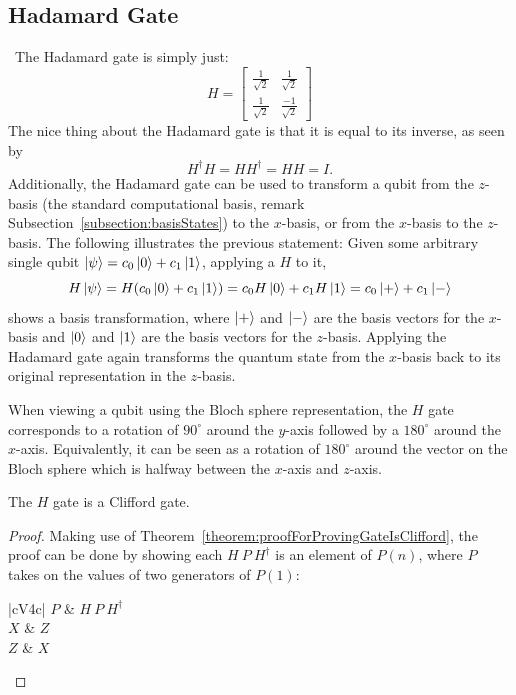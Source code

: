 \subsection{Hadamard Gate}\
The Hadamard gate is simply just:
$$H = \begin{bmatrix} \frac{1}{\sqrt{2}} & \frac{1}{\sqrt{2}} \\ \frac{1}{\sqrt{2}} & \frac{-1}{\sqrt{2}}\end{bmatrix}$$
The nice thing about the Hadamard gate is that it is equal to its inverse, as seen by $$H^{\dagger}H = HH^{\dagger} = HH = I.$$ Additionally, the Hadamard gate can be used to transform a qubit from the $z$-basis (the standard computational basis, remark Subsection~\ref{subsection:basisStates}) to the $x$-basis, or from the $x$-basis to the $z$-basis. The following illustrates the previous statement: Given some arbitrary single qubit $\ket{\psi} = c_0\ket{0} + c_1\ket{1}$, applying a $H$ to it,
$$H\ket{\psi} = H(c_0\ket{0} + c_1\ket{1}) = c_0H\ket{0} + c_1H\ket{1} = c_0\ket{+} + c_1\ket{-}$$
shows a basis transformation, where $\ket{+}$ and $\ket{-}$ are the basis vectors for the $x$-basis and $\ket{0}$ and $\ket{1}$ are the basis vectors for the $z$-basis. Applying the Hadamard gate again transforms the quantum state from the $x$-basis back to its original representation in the $z$-basis.

When viewing a qubit using the Bloch sphere representation, the $H$ gate corresponds to a rotation of $90^{\circ}$ around the $y$-axis followed by a $180^{\circ}$ around the $x$-axis. Equivalently, it can be seen as a rotation of $180^{\circ}$ around the vector on the Bloch sphere which is halfway between the $x$-axis and $z$-axis.
\begin{theorem}
The $H$ gate is a Clifford gate.
\end{theorem}
\begin{proof}
Making use of Theorem~\ref{theorem:proofForProvingGateIsClifford}, the proof can be done by showing each $H \ P \ H^{\dagger}$ is an element of $P(n)$, where $P$ takes on the values of two generators of $P(1)$:
\begin{table}[H]
\caption{A table showing $H$ is a Clifford gate. \label{table:HisAcliffordGate}}
\begin{center}
\begin{tabular}{ |cV{4}c| }
\hline
$P$ & $H \ P \ H^{\dagger}$ \\
 $X$ & $Z$ \\
\hline $Z$ & $X$ \\
\hline
\end{tabular}
\end{center}
\end{table}
\end{proof}

